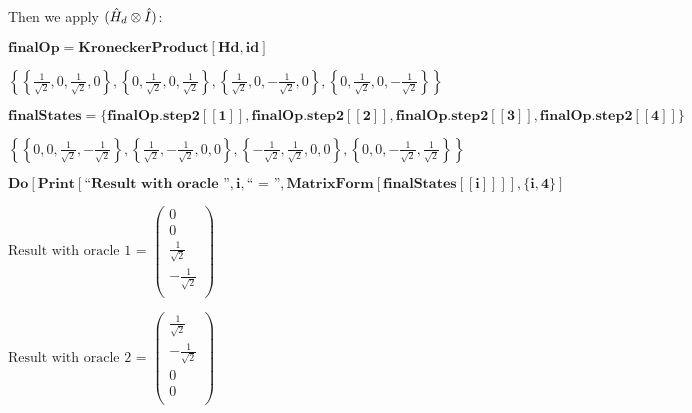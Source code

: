 Then we apply \((\hat{H}_d \otimes \hat{I})\):

\begin{doublespace}
\noindent\(\pmb{\text{finalOp}=\text{KroneckerProduct}[\text{Hd}, \text{id}]}\)
\end{doublespace}

\begin{doublespace}
\noindent\(\left\{\left\{\frac{1}{\sqrt{2}},0,\frac{1}{\sqrt{2}},0\right\},\left\{0,\frac{1}{\sqrt{2}},0,\frac{1}{\sqrt{2}}\right\},\left\{\frac{1}{\sqrt{2}},0,-\frac{1}{\sqrt{2}},0\right\},\left\{0,\frac{1}{\sqrt{2}},0,-\frac{1}{\sqrt{2}}\right\}\right\}\)
\end{doublespace}

\begin{doublespace}
\noindent\(\pmb{\text{finalStates} = \{\text{finalOp}.\text{step2}[[1]], \text{finalOp}.\text{step2}[[2]],\text{finalOp}.\text{step2}[[3]], \text{finalOp}.\text{step2}[[4]]\}}\)
\end{doublespace}

\begin{doublespace}
\noindent\(\left\{\left\{0,0,\frac{1}{\sqrt{2}},-\frac{1}{\sqrt{2}}\right\},\left\{\frac{1}{\sqrt{2}},-\frac{1}{\sqrt{2}},0,0\right\},\left\{-\frac{1}{\sqrt{2}},\frac{1}{\sqrt{2}},0,0\right\},\left\{0,0,-\frac{1}{\sqrt{2}},\frac{1}{\sqrt{2}}\right\}\right\}\)
\end{doublespace}

\begin{doublespace}
\noindent\(\pmb{\text{Do}[\text{Print}[\text{{``}Result with oracle {''}},i,\text{{``} = {''}}, \text{MatrixForm}[\text{finalStates}[[i]]]], \{i,
4\}]}\)
\end{doublespace}

\noindent\(\text{Result with oracle }1\text{ = }\left(
\begin{array}{c}
 0 \\
 0 \\
 \frac{1}{\sqrt{2}} \\
 -\frac{1}{\sqrt{2}} \\
\end{array}
\right)\)

\noindent\(\text{Result with oracle }2\text{ = }\left(
\begin{array}{c}
 \frac{1}{\sqrt{2}} \\
 -\frac{1}{\sqrt{2}} \\
 0 \\
 0 \\
\end{array}
\right)\)


